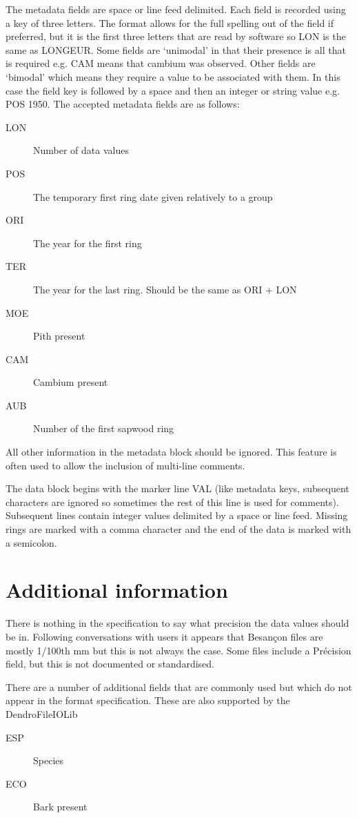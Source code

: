 The metadata fields are space or line feed delimited. Each field is recorded using a key of three letters. The format allows for the full spelling out of the field if preferred, but it is the first three letters that are read by software so LON is the same as LONGEUR. Some fields are `unimodal' in that their presence is all that is required e.g. CAM means that cambium was observed. Other fields are `bimodal' which means they require a value to be associated with them. In this case the field key is followed by a space and then an integer or string value e.g. POS 1950. The accepted metadata fields are as follows:
    \begin{description}
          \item[LON] Number of data values
          \item[POS] The temporary first ring date given relatively to a group
          \item[ORI] The year for the first ring
          \item[TER] The year for the last ring. Should be the same as ORI + LON
          \item[MOE] Pith present
          \item[CAM] Cambium present
          \item[AUB] Number of the first sapwood ring 
    \end{description}   
All other information in the metadata block should be ignored. This feature is often used to allow the inclusion of multi-line comments. 

The data block begins with the marker line VAL (like metadata keys, subsequent characters are ignored so sometimes the rest of this line is used for comments). Subsequent lines contain integer values delimited by a space or line feed. Missing rings are marked with a comma character and the end of the data is marked with a semicolon. 


\section{Additional information}

\begin{itemize*}
  \item There is nothing in the specification to say what precision the data values should be in. Following conversations with users it appears that Besan\c{c}on files are mostly 1/100th mm but this is not always the case. Some files include a Précision field, but this is not documented or standardised.
  \item There are a number of additional fields that are commonly used but which do not appear in the format specification. These are also supported by the DendroFileIOLib
  \begin{description}
    \item[ESP] Species
    \item[ECO] Bark present  
  \end{description}
\end{itemize*}

